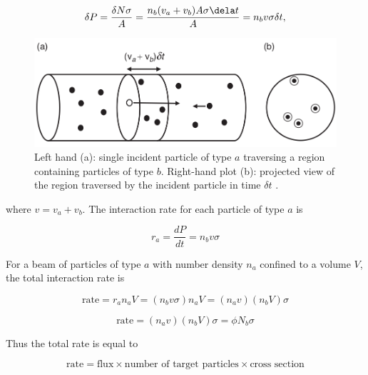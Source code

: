 \begin{equation}
\delta P= \frac{\delta N \sigma}{A}=\frac{n_{b}(v_{a}+v_{b})A\sigma \dela t}{A}= n_{b}v\sigma \delta t ,
\end{equation}

\begin{center}
  \begin{figure}[h!]
    \centering
\includegraphics[scale=.35]{Chapter1/cross_section.png} 
 \caption[Cross section illustration]{Left hand (a): single incident particle of type $a$ traversing a region containing particles of type $b$. Right-hand plot (b): projected view of the region traversed by the incident particle in time $\delta t$ \cite{thomson_2013}.}
    \label{cross_section}
  \end{figure}
\end{center}


where $v=v_{a}+v_{b}$. The interaction rate for each particle of type $a$ is

\begin{equation}
r_{a}= \frac{dP}{dt}= n_{b} v\sigma
\end{equation}

For a beam of particles of type $a$ with number density $n_{a}$ confined to a volume $V$, the total interaction rate is

\begin{equation*}
\text{rate}=r_{a}n_{a}V=(n_{b}v\sigma) n_{a}V= (n_{a}v)(n_{b}V)\sigma
\end{equation*}

\begin{equation*}
\text{rate}=(n_{a}v)(n_{b}V) \sigma = \phi N_{b} \sigma
\end{equation*}

Thus the total rate is equal to

\begin{equation}
\text{rate}= \text{flux} \times \text{number of target particles} \times \text{cross section}
\end{equation}

